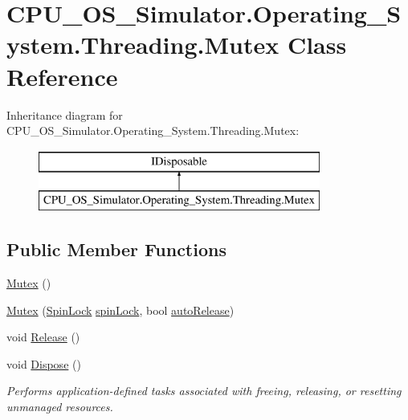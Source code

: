 \hypertarget{class_c_p_u___o_s___simulator_1_1_operating___system_1_1_threading_1_1_mutex}{}\section{C\+P\+U\+\_\+\+O\+S\+\_\+\+Simulator.\+Operating\+\_\+\+System.\+Threading.\+Mutex Class Reference}
\label{class_c_p_u___o_s___simulator_1_1_operating___system_1_1_threading_1_1_mutex}
Inheritance diagram for C\+P\+U\+\_\+\+O\+S\+\_\+\+Simulator.\+Operating\+\_\+\+System.\+Threading.\+Mutex\+:\begin{figure}[H]
\begin{center}
\leavevmode
\includegraphics[height=2.000000cm]{class_c_p_u___o_s___simulator_1_1_operating___system_1_1_threading_1_1_mutex}
\end{center}
\end{figure}
\subsection*{Public Member Functions}
\begin{DoxyCompactItemize}
\item 
\hyperlink{class_c_p_u___o_s___simulator_1_1_operating___system_1_1_threading_1_1_mutex_af3eb54a049e4c9918cafcbbc63337b2d}{Mutex} ()
\item 
\hyperlink{class_c_p_u___o_s___simulator_1_1_operating___system_1_1_threading_1_1_mutex_a243332a3edc839e58caac011c42d68e5}{Mutex} (\hyperlink{class_c_p_u___o_s___simulator_1_1_operating___system_1_1_threading_1_1_spin_lock}{Spin\+Lock} \hyperlink{class_c_p_u___o_s___simulator_1_1_operating___system_1_1_threading_1_1_mutex_ac6a3c332cf52ba404c62451757a138f4}{spin\+Lock}, bool \hyperlink{class_c_p_u___o_s___simulator_1_1_operating___system_1_1_threading_1_1_mutex_ab790d6f02a5acb80b11ec17852ffc4d9}{auto\+Release})
\item 
void \hyperlink{class_c_p_u___o_s___simulator_1_1_operating___system_1_1_threading_1_1_mutex_a0078ef392cdb695e7e4d095fab1fe1c2}{Release} ()
\item 
void \hyperlink{class_c_p_u___o_s___simulator_1_1_operating___system_1_1_threading_1_1_mutex_ad02ebaded0499b81b46dcdbc0a764fbe}{Dispose} ()
\begin{DoxyCompactList}\small\item\em Performs application-\/defined tasks associated with freeing, releasing, or resetting unmanaged resources. \end{DoxyCompactList}\end{DoxyCompactItemize}
